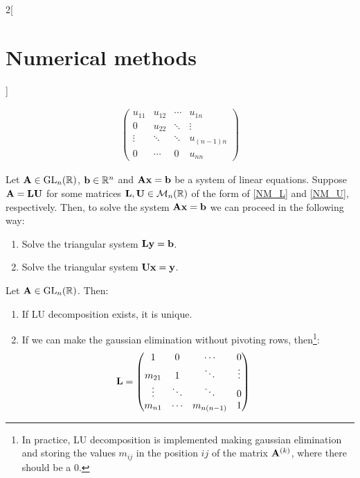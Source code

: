 \documentclass[../../../main.tex]{subfiles}
\begin{document}
\begin{multicols}{2}[\section{Numerical methods}]
\begin{definition}[LU descompostion]
\begin{gather}
\begin{pmatrix}
                u_{11} & u_{12} & \cdots & u_{1n}     \\
                0      & u_{22} & \ddots & \vdots     \\
                \vdots & \ddots & \ddots & u_{(n-1)n} \\
                0      & \cdots & 0      & u_{nn}
            \end{pmatrix}
        \end{gather}
    \end{definition}
    \begin{lemma}
        Let $\vb{A}\in\mathrm{GL}_n(\mathbb{R})$, $\vb{b}\in\mathbb{R}^n$ and $\vb{A}\vb{x}=\vb{b}$ be a system of linear equations. Suppose $\vb{A}=\vb{L}\vb{U}$ for some matrices $\vb{L},\vb{U}\in\mathcal{M}_n(\mathbb{R})$ of the form of \eqref{NM_L} and \eqref{NM_U}, respectively. Then, to solve the system $\vb{A}\vb{x}=\vb{b}$ we can proceed in the following way:
        \begin{enumerate}
            \item Solve the triangular system $\vb{L}\vb{y}=\vb{b}$.
            \item Solve the triangular system $\vb{U}\vb{x}=\vb{y}$.
        \end{enumerate}
    \end{lemma}
    \begin{prop}
        Let $\vb{A}\in\mathrm{GL}_n(\mathbb{R})$. Then:
        \begin{enumerate}
            \item If LU decomposition exists, it is unique.
            \item If we can make the gaussian elimination without pivoting rows, then\footnote{In practice, LU decomposition is implemented making gaussian elimination and storing the values $m_{ij}$ in the position $ij$ of the matrix $\vb{A}^{(k)}$, where there should be a 0.}:
                  $$
                      \vb{L}=
                      \begin{pmatrix}
                          1      & 0      & \cdots     & 0      \\
                          m_{21} & 1      & \ddots     & \vdots \\
                          \vdots & \ddots & \ddots     & 0      \\
                          m_{n1} & \cdots & m_{n(n-1)} & 1
                      \end{pmatrix}\quad
$$
\end{enumerate}
\end{prop}
\end{multicols}
\end{document}
